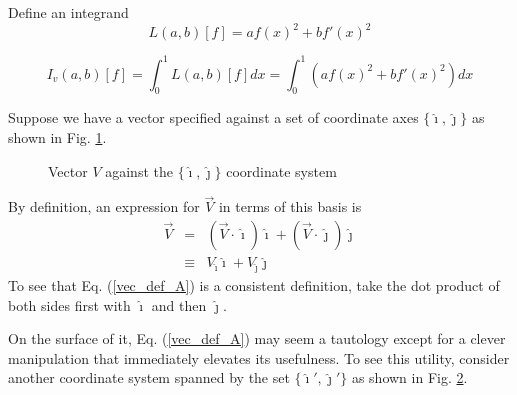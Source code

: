 \documentclass[10pt]{article}
\begin{document}
Define an integrand
\[
  L(a,b)[f] = a f(x)^2 + b f'(x)^2
\]

\[
  I_v(a,b)[f] = \int_0^1 L(a,b)[f] dx = \int_0^1 \left( a f(x)^2 + b f'(x)^2 \right) dx
\]
\normalsize

\newpage
\null
Suppose we have a vector specified against a set of coordinate
axes $\{ \hat \imath, \hat \jmath \}$ as shown in 
Fig. \ref{fig_simp_vec}.

\begin{figure}[htp]
\centering
\caption{Vector $V$ against the $\{\hat \imath, \hat \jmath\}$ coordinate system}\label{fig_simp_vec}
\end{figure}

\noindent By definition, an expression for $\vec V$ in terms of this basis
is 
\begin{eqnarray}\label{vec_def_A}
  \vec V & =       &   \left( \vec V \cdot \hat \imath \right) \hat \imath 
                     + \left( \vec V \cdot \hat \jmath \right) \hat \jmath \\
         & \equiv  &   V_{\hat \imath} \hat \imath 
                     + V_{\hat \jmath} \hat \jmath
\end{eqnarray}
To see that Eq. (\ref{vec_def_A}) is a consistent definition, take the 
dot product of both sides first with $\hat \imath$ and then $\hat \jmath$.

On the surface of it, Eq. (\ref{vec_def_A}) may seem a tautology except
for a clever manipulation that immediately elevates its usefulness. To
see this utility, consider another coordinate system spanned by the set
$\{ \hat \imath ', \hat \jmath'\}$ as shown in Fig. 
\ref{fig_vec_trans_A}.

\begin{figure}[htp]
\centering
\caption{}\label{fig_vec_trans_A}
\end{figure}
\end{document}
